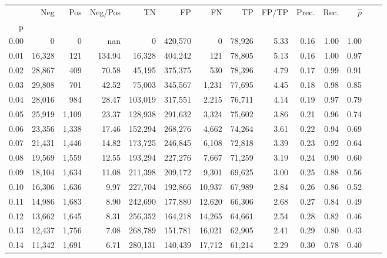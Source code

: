 \begin{tabular}{rrrrrrrrrrrrrr}
\toprule
{} &     Neg &    Pos & Neg/Pos &       TN &       FP &      FN &      TP & FP/TP & Prec. &  Rec. & $\hat{p}$ \\
p    &         &        &         &          &          &         &         &       &       &       &           \\
\midrule
0.00 &       0 &      0 &     nan &        0 &  420,570 &       0 &  78,926 &  5.33 &  0.16 &  1.00 &      1.00 \\
0.01 &  16,328 &    121 &  134.94 &   16,328 &  404,242 &     121 &  78,805 &  5.13 &  0.16 &  1.00 &      0.97 \\
0.02 &  28,867 &    409 &   70.58 &   45,195 &  375,375 &     530 &  78,396 &  4.79 &  0.17 &  0.99 &      0.91 \\
0.03 &  29,808 &    701 &   42.52 &   75,003 &  345,567 &   1,231 &  77,695 &  4.45 &  0.18 &  0.98 &      0.85 \\
0.04 &  28,016 &    984 &   28.47 &  103,019 &  317,551 &   2,215 &  76,711 &  4.14 &  0.19 &  0.97 &      0.79 \\
0.05 &  25,919 &  1,109 &   23.37 &  128,938 &  291,632 &   3,324 &  75,602 &  3.86 &  0.21 &  0.96 &      0.74 \\
0.06 &  23,356 &  1,338 &   17.46 &  152,294 &  268,276 &   4,662 &  74,264 &  3.61 &  0.22 &  0.94 &      0.69 \\
0.07 &  21,431 &  1,446 &   14.82 &  173,725 &  246,845 &   6,108 &  72,818 &  3.39 &  0.23 &  0.92 &      0.64 \\
0.08 &  19,569 &  1,559 &   12.55 &  193,294 &  227,276 &   7,667 &  71,259 &  3.19 &  0.24 &  0.90 &      0.60 \\
0.09 &  18,104 &  1,634 &   11.08 &  211,398 &  209,172 &   9,301 &  69,625 &  3.00 &  0.25 &  0.88 &      0.56 \\
0.10 &  16,306 &  1,636 &    9.97 &  227,704 &  192,866 &  10,937 &  67,989 &  2.84 &  0.26 &  0.86 &      0.52 \\
0.11 &  14,986 &  1,683 &    8.90 &  242,690 &  177,880 &  12,620 &  66,306 &  2.68 &  0.27 &  0.84 &      0.49 \\
0.12 &  13,662 &  1,645 &    8.31 &  256,352 &  164,218 &  14,265 &  64,661 &  2.54 &  0.28 &  0.82 &      0.46 \\
0.13 &  12,437 &  1,756 &    7.08 &  268,789 &  151,781 &  16,021 &  62,905 &  2.41 &  0.29 &  0.80 &      0.43 \\
0.14 &  11,342 &  1,691 &    6.71 &  280,131 &  140,439 &  17,712 &  61,214 &  2.29 &  0.30 &  0.78 &      0.40 \\

\end{tabular}
